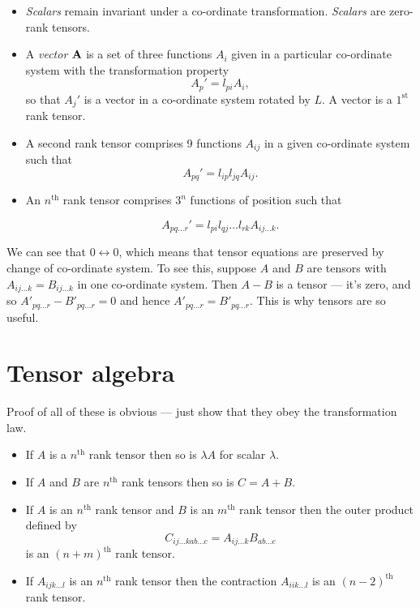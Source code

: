 \documentclass{notes}
\theoremstyle{plain}
\begin{document}
\begin{itemize}
\item \emph{Scalars} remain invariant under a co-ordinate
  transformation.  \emph{Scalars} are zero-rank tensors.

\item A \emph{vector} $\mathbf{A}$ is a set of three functions $A_i$
  given in a particular co-ordinate system with the transformation
  property
\[
A_p' = l_{pi} A_i,
\]
so that $A_j'$ is a vector in a co-ordinate system rotated by $L$.  A
vector is a $1^{\text{st}}$ rank tensor.

\item A second rank tensor comprises 9 functions $A_{ij}$ in a given
  co-ordinate system such that
\[
A_{pq}' = l_{ip} l_{jq} A_{ij}.
\]

\item An $n^{\text{th}}$ rank tensor comprises $3^n$ functions of
  position such that

\[
A_{p q \dots r}' = l_{pi} l_{qj} \dots l_{rk} A_{ij \dots k}.
\]
\end{itemize}

We can see that $0 \leftrightarrow 0$, which means that tensor
equations are preserved by change of co-ordinate system.  To see this,
suppose $A$ and $B$ are tensors with $A_{ij \dots k} = B_{ij \dots k}$
in one co-ordinate system.  Then $A - B$ is a tensor --- it's zero,
and so $A'_{p q \dots r} - B'_{p q \dots r} = 0$ and hence $A'_{p q \dots r}
= B'_{p q \dots r}$.  This is why tensors are so useful.

\section{Tensor algebra}

Proof of all of these is obvious --- just show that they obey the
transformation law.

\begin{itemize}
\item If $A$ is a $n^{\text{th}}$ rank tensor then so is $\lambda A$
  for scalar $\lambda$.
\item If $A$ and $B$ are $n^{\text{th}}$ rank tensors then so is $C =
  A + B$.
\item If $A$ is an $n^{\text{th}}$ rank tensor and $B$ is an
  $m^{\text{th}}$ rank tensor then the outer product defined by
\[
C_{i j \dots k a b \dots c} = A_{i j \dots k} B_{a b \dots c}
\]
is an $(n + m)^{\text{th}}$ rank tensor.
\item If $A_{i j k \dots l}$ is an $n^{\text{th}}$ rank tensor then
  the contraction $A_{i i k \dots l}$ is an $(n-2)^{\text{th}}$ rank tensor.
\end{itemize}
\end{document}
